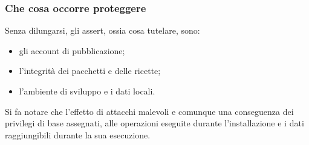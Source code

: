 \subsubsection{Che cosa occorre proteggere}
Senza dilungarsi, gli assert, ossia cosa tutelare, sono:
\begin{itemize}
    \item[] gli account di pubblicazione;
    \item[] l’integrità dei pacchetti e delle ricette;
    \item[] l’ambiente di sviluppo e i dati locali.
\end{itemize}

Si fa notare che l’effetto di attacchi malevoli e 
comunque una conseguenza dei privilegi di base assegnati, 
alle operazioni eseguite durante l’installazione e i dati raggiungibili 
durante la sua esecuzione.